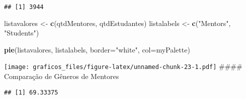 \documentclass[
]{article}
\newenvironment{Shaded}{\begin{snugshade}}{\end{snugshade}}
\newcommand{\DataTypeTok}[1]{\textcolor[rgb]{0.13,0.29,0.53}{#1}}
\newcommand{\DecValTok}[1]{\textcolor[rgb]{0.00,0.00,0.81}{#1}}
\newcommand{\KeywordTok}[1]{\textcolor[rgb]{0.13,0.29,0.53}{\textbf{#1}}}
\newcommand{\NormalTok}[1]{#1}
\newcommand{\OperatorTok}[1]{\textcolor[rgb]{0.81,0.36,0.00}{\textbf{#1}}}
\newcommand{\StringTok}[1]{\textcolor[rgb]{0.31,0.60,0.02}{#1}}
\begin{document}
\begin{verbatim}
## [1] 3944
\end{verbatim}

\begin{Shaded}
\begin{Highlighting}[]
\NormalTok{listavalores <-}\StringTok{ }\KeywordTok{c}\NormalTok{(qtdMentores, qtdEstudantes)}
\NormalTok{listalabels <-}\StringTok{ }\KeywordTok{c}\NormalTok{(}\StringTok{"Mentors"}\NormalTok{, }\StringTok{"Students"}\NormalTok{)}


\KeywordTok{pie}\NormalTok{(listavalores, listalabels, }\DataTypeTok{border=}\StringTok{"white"}\NormalTok{, }\DataTypeTok{col=}\NormalTok{myPalette)}
\end{Highlighting}
\end{Shaded}

\texttt{[image: graficos\_files/figure-latex/unnamed-chunk-23-1.pdf]}
\#\#\#\# Comparação de Gêneros de Mentores

\begin{Shaded}
\end{Shaded}

\begin{verbatim}
## [1] 69.33375
\end{verbatim}
\end{document}
